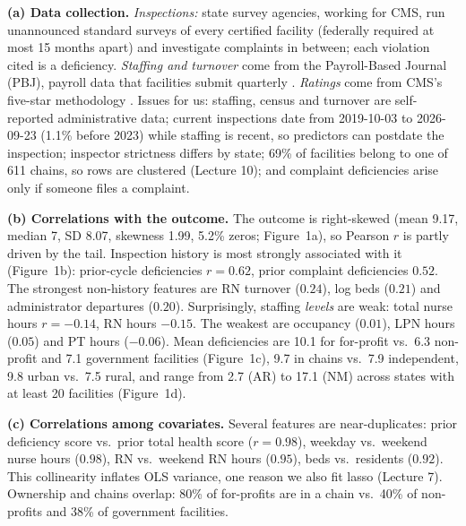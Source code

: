 \textbf{(a) Data collection.} \emph{Inspections:} state survey agencies, working for CMS, run unannounced standard surveys of every certified facility (federally required at most 15 months apart) and investigate complaints in between; each violation cited is a deficiency. \emph{Staffing and turnover} come from the Payroll-Based Journal (PBJ), payroll data that facilities submit quarterly . \emph{Ratings} come from CMS's five-star methodology . Issues for us: staffing, census and turnover are self-reported administrative data; current inspections date from 2019-10-03 to 2026-09-23 (1.1\% before 2023) while staffing is recent, so predictors can postdate the inspection; inspector strictness differs by state; 69\% of facilities belong to one of 611 chains, so rows are clustered (Lecture 10); and complaint deficiencies arise only if someone files a complaint.

\textbf{(b) Correlations with the outcome.} The outcome is right-skewed (mean 9.17, median 7, SD 8.07, skewness 1.99, 5.2\% zeros; Figure~1a), so Pearson $r$ is partly driven by the tail. Inspection history is most strongly associated with it (Figure~1b): prior-cycle deficiencies $r=0.62$, prior complaint deficiencies $0.52$. The strongest non-history features are RN turnover ($0.24$), log beds ($0.21$) and administrator departures ($0.20$). Surprisingly, staffing \emph{levels} are weak: total nurse hours $r=-0.14$, RN hours $-0.15$. The weakest are occupancy ($0.01$), LPN hours ($0.05$) and PT hours ($-0.06$). Mean deficiencies are 10.1 for for-profit vs.\ 6.3 non-profit and 7.1 government facilities (Figure~1c), 9.7 in chains vs.\ 7.9 independent, 9.8 urban vs.\ 7.5 rural, and range from 2.7 (AR) to 17.1 (NM) across states with at least 20 facilities (Figure~1d).

\textbf{(c) Correlations among covariates.} Several features are near-duplicates: prior deficiency score vs.\ prior total health score ($r=0.98$), weekday vs.\ weekend nurse hours ($0.98$), RN vs.\ weekend RN hours ($0.95$), beds vs.\ residents ($0.92$). This collinearity inflates OLS variance, one reason we also fit lasso (Lecture 7). Ownership and chains overlap: 80\% of for-profits are in a chain vs.\ 40\% of non-profits and 38\% of government facilities.

